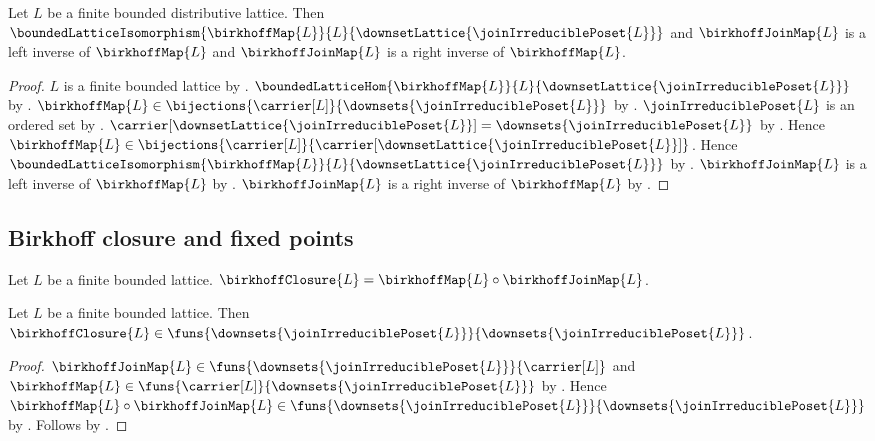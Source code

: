 \begin{theorem}\label{finite_birkhoff_bounded_lattice_isomorphism}
    Let $L$ be a finite bounded distributive lattice.
    Then $\boundedLatticeIsomorphism
        {\birkhoffMap{L}}{L}
        {\downsetLattice{\joinIrreduciblePoset{L}}}$ and
        $\birkhoffJoinMap{L}$ is a left inverse of $\birkhoffMap{L}$ and
        $\birkhoffJoinMap{L}$ is a right inverse of $\birkhoffMap{L}$.
\end{theorem}
\begin{proof}
    $L$ is a finite bounded lattice by .
    $\boundedLatticeHom
        {\birkhoffMap{L}}{L}
        {\downsetLattice{\joinIrreduciblePoset{L}}}$ by
        .
    $\birkhoffMap{L}\in
        \bijections{\carrier[L]}
            {\downsets{\joinIrreduciblePoset{L}}}$ by
        .
    $\joinIrreduciblePoset{L}$ is an ordered set by
        .
    $\carrier[\downsetLattice{\joinIrreduciblePoset{L}}]
        =\downsets{\joinIrreduciblePoset{L}}$ by
        .
    Hence $\birkhoffMap{L}\in
        \bijections{\carrier[L]}
            {\carrier[\downsetLattice{\joinIrreduciblePoset{L}}]}$.
    Hence $\boundedLatticeIsomorphism
        {\birkhoffMap{L}}{L}
        {\downsetLattice{\joinIrreduciblePoset{L}}}$ by
        .
    $\birkhoffJoinMap{L}$ is a left inverse of $\birkhoffMap{L}$ by
        .
    $\birkhoffJoinMap{L}$ is a right inverse of $\birkhoffMap{L}$ by
        .
\end{proof}

\subsection{Birkhoff closure and fixed points}

\begin{definition}\label{birkhoff_closure}
    Let $L$ be a finite bounded lattice.
    $\birkhoffClosure{L}=\birkhoffMap{L}\circ\birkhoffJoinMap{L}$.
\end{definition}

\begin{proposition}\label{birkhoff_closure_type}
    Let $L$ be a finite bounded lattice.
    Then $\birkhoffClosure{L}\in
        \funs{\downsets{\joinIrreduciblePoset{L}}}
            {\downsets{\joinIrreduciblePoset{L}}}$.
\end{proposition}
\begin{proof}
    $\birkhoffJoinMap{L}\in
        \funs{\downsets{\joinIrreduciblePoset{L}}}{\carrier[L]}$ and
        $\birkhoffMap{L}\in
        \funs{\carrier[L]}{\downsets{\joinIrreduciblePoset{L}}}$ by
        .
    Hence $\birkhoffMap{L}\circ\birkhoffJoinMap{L}\in
        \funs{\downsets{\joinIrreduciblePoset{L}}}
            {\downsets{\joinIrreduciblePoset{L}}}$ by
        .
    Follows by .
\end{proof}

